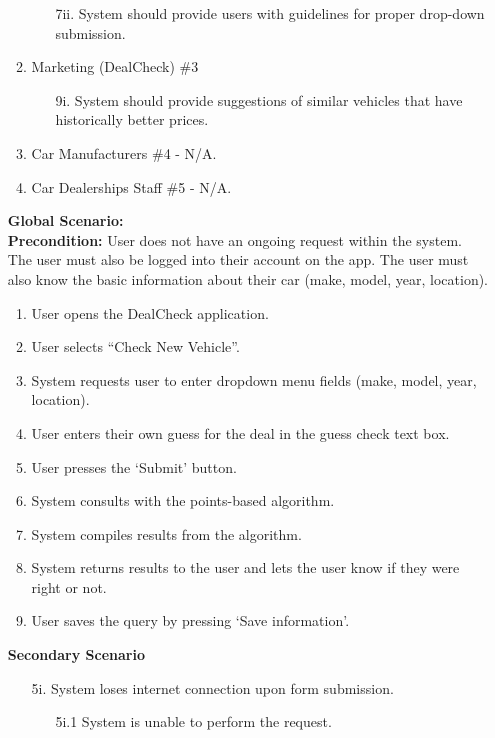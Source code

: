 \documentclass[]{article}
\begin{document}
\begin{enumerate}[{\bf {BE}1.}]
\begin{enumerate}[{\bf VP1.}]
\begin{enumerate}
          \item[7ii.] System should provide users with guidelines for proper drop-down submission.
        \end{enumerate}
      \item Marketing (DealCheck) \#3
        \begin{enumerate}
          \item[9i.] System should provide suggestions of similar vehicles that have historically better prices.
        \end{enumerate}
      \item Car Manufacturers \#4 - N/A.
      \item Car Dealerships Staff \#5 - N/A.
    \end{enumerate}
    
    \textbf{Global Scenario:} \\
    \textbf{Precondition:} User does not have an ongoing request within the system. The user must also be logged into their account on the app. The user must also know the basic information about their car (make, model, year, location).
    \begin{enumerate}[{\bf 1.}]
      \item User opens the DealCheck application.
      \item User selects “Check New Vehicle”.
      \item System requests user to enter dropdown menu fields (make, model, year, location).
      \item User enters their own guess for the deal in the guess check text box.
      \item User presses the ‘Submit’ button.
      \item System consults with the points-based algorithm.
      \item System compiles results from the algorithm.
      \item System returns results to the user and lets the user know if they were right or not.
      \item User saves the query by pressing ‘Save information’.
    \end{enumerate}
    \textbf{Secondary Scenario}
    \begin{enumerate}
      \item[5i.] System loses internet connection upon form submission.
      \begin{enumerate}
        \item[5i.1] System is unable to perform the request.

\end{enumerate}
\end{enumerate}
\end{enumerate}
\end{document}
